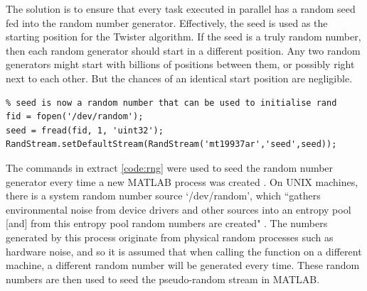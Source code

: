\documentclass[11pt]{article}
\numberwithin{equation}{subsection}
\begin{document}
The solution is to ensure that every task executed in parallel has a random seed fed into the random number generator. Effectively, the seed is used as the starting position for the Twister algorithm. If the seed is a truly random number, then each random generator should start in a different position. Any two random generators might start with billions of positions between them, or possibly right next to each other. But the chances of an identical start position are negligible.

\begin{lstlisting}[float=ht,style=Matlab-editor,caption = {Seeding random generator},label=code:rng]
% Ensures truly random numbers for each process
% seed is now a random number that can be used to initialise rand
fid = fopen('/dev/random');
seed = fread(fid, 1, 'uint32');
RandStream.setDefaultStream(RandStream('mt19937ar','seed',seed));
\end{lstlisting}

The commands in extract \ref{code:rng} were used to seed the random number generator every time a new MATLAB process was created \cite{randomblog}. On UNIX machines, there is a system random number source \mbox{`/dev/random'}, which ``gathers environmental noise from device drivers and other sources into an entropy pool [and] from this entropy pool random numbers are created" \cite{devrandom}. The numbers generated by this process originate from physical random processes such as hardware noise, and so it is assumed that when calling the function on a different machine, a different random number will be generated every time. These random numbers are then used to seed the pseudo-random stream in MATLAB.
\end{document}
